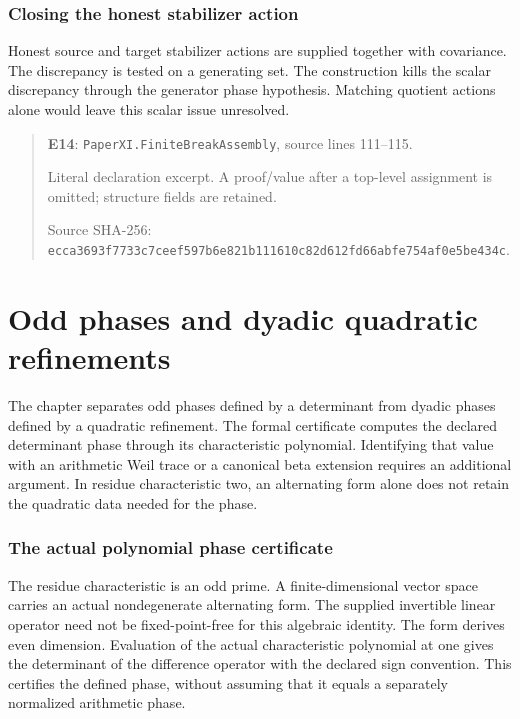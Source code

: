 \documentclass[10pt,oneside]{book}
\begin{document}

\subsection{Closing the honest stabilizer action}
\label{guide:E14}
Honest source and target stabilizer actions are supplied together with covariance. The discrepancy is tested on a generating set.
The construction kills the scalar discrepancy through the generator phase hypothesis. Matching quotient actions alone would leave this scalar issue unresolved.

\begin{quote}\footnotesize\textbf{E14}: \nolinkurl{PaperXI.FiniteBreakAssembly}, source lines 111--115.\par Literal declaration excerpt. A proof/value after a top-level assignment is omitted; structure fields are retained.\par Source SHA-256: {\scriptsize\texttt{ecca3693f7733c7ceef597b6e821b111610c82d612fd66abfe754af0e5be434c}}.\end{quote}


\chapter{Odd phases and dyadic quadratic refinements}
The chapter separates odd phases defined by a determinant from dyadic phases defined by a quadratic refinement. The formal certificate computes the declared determinant phase through its characteristic polynomial. Identifying that value with an arithmetic Weil trace or a canonical beta extension requires an additional argument. In residue characteristic two, an alternating form alone does not retain the quadratic data needed for the phase.

\subsection{The actual polynomial phase certificate}
\label{guide:E15}
The residue characteristic is an odd prime. A finite-dimensional vector space carries an actual nondegenerate alternating form. The supplied invertible linear operator need not be fixed-point-free for this algebraic identity.
The form derives even dimension. Evaluation of the actual characteristic polynomial at one gives the determinant of the difference operator with the declared sign convention. This certifies the defined phase, without assuming that it equals a separately normalized arithmetic phase.
\end{document}
